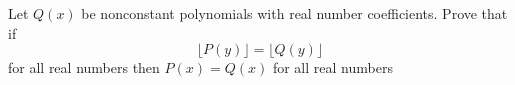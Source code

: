 Let  $Q(x)$ be nonconstant polynomials with real number coefficients. Prove that if
\[\lfloor P(y) \rfloor = \lfloor Q(y) \rfloor\]for all real numbers  then $P(x) = Q(x)$ for all real numbers 